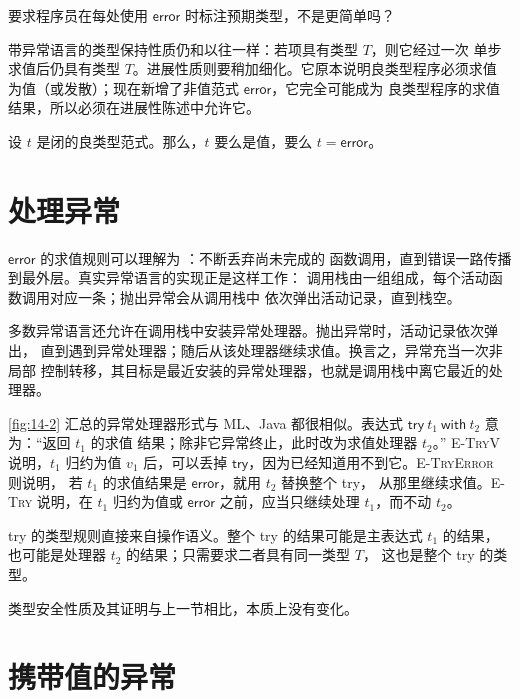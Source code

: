 \begin{exercise}[\(\star\)]
\label{ex:14.1.1}
要求程序员在每处使用 \(\mathsf{error}\) 时标注预期类型，不是更简单吗？
\end{exercise}

带异常语言的类型保持性质仍和以往一样：若项具有类型 \(T\)，则它经过一次
单步求值后仍具有类型 \(T\)。进展性质则要稍加细化。它原本说明良类型程序必须求值
为值（或发散）；现在新增了非值范式 \(\mathsf{error}\)，它完全可能成为
良类型程序的求值结果，所以必须在进展性陈述中允许它。

\begin{theorem}[进展性]
\label{thm:14.1.2}
设 \(t\) 是闭的良类型范式。那么，\(t\) 要么是值，要么
\(t=\mathsf{error}\)。
\end{theorem}

\section{处理异常}
\label{sec:14.2}

\(\mathsf{error}\) 的求值规则可以理解为
：不断丢弃尚未完成的
函数调用，直到错误一路传播到最外层。真实异常语言的实现正是这样工作：
调用栈由一组组成，每个活动函数调用对应一条；抛出异常会从调用栈中
依次弹出活动记录，直到栈空。

多数异常语言还允许在调用栈中安装异常处理器。抛出异常时，活动记录依次弹出，
直到遇到异常处理器；随后从该处理器继续求值。换言之，异常充当一次非局部
控制转移，其目标是最近安装的异常处理器，也就是调用栈中离它最近的处理器。

\cref{fig:14-2} 汇总的异常处理器形式与 ML、Java 都很相似。表达式
\(\mathsf{try}\ t_1\ \mathsf{with}\ t_2\) 意为：“返回 \(t_1\) 的求值
结果；除非它异常终止，此时改为求值处理器 \(t_2\)。”
\textsc{E-TryV} 说明，\(t_1\) 归约为值 \(v_1\) 后，可以丢掉
\(\mathsf{try}\)，因为已经知道用不到它。\textsc{E-TryError} 则说明，
若 \(t_1\) 的求值结果是 \(\mathsf{error}\)，就用 \(t_2\) 替换整个 try，
从那里继续求值。\textsc{E-Try} 说明，在 \(t_1\) 归约为值或
\(\mathsf{error}\) 之前，应当只继续处理 \(t_1\)，而不动 \(t_2\)。

try 的类型规则直接来自操作语义。整个 try 的结果可能是主表达式 \(t_1\)
的结果，也可能是处理器 \(t_2\) 的结果；只需要求二者具有同一类型 \(T\)，
这也是整个 try 的类型。

类型安全性质及其证明与上一节相比，本质上没有变化。

\section{携带值的异常}
\label{sec:14.3}

